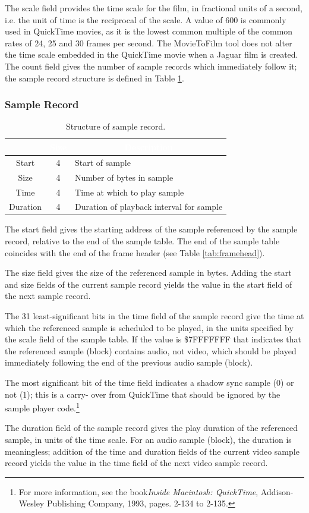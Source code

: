 \documentclass[12pt,letterpaper,twoside]{article}
\newcommand{\tabheadtxt}[1]{\multicolumn{1}{c}{\textcolor{white}{\textbf{#1}}}}
\begin{document}
The scale field provides the time scale for the film, in fractional units of a second, i.e. the unit of time is the reciprocal of the scale. A value of 600 is commonly used in QuickTime movies, as it is the lowest common multiple of the common rates of 24, 25 and 30 frames per second. The MovieToFilm tool does not alter the time scale embedded in the QuickTime movie when a Jaguar film is created. 
The count field gives the number of sample records which immediately follow it; the sample record structure is defined in Table \ref{tab:samplerec}.

\subsubsection{Sample Record}

\begin{table}[h]
\centering
\begin{tabular}{|c|c|p{9cm}|}
\hline
\rowcolor{black}
\tabheadtxt{Field} & \tabheadtxt{Size} & \tabheadtxt{Description} \\
\hline
Start & 4 & Start of sample\\
\hline
Size & 4 & Number of bytes in sample\\
\hline
Time & 4 & Time at which to play sample\\
\hline
Duration & 4 & Duration of playback interval for sample\\
\hline
\end{tabular}
\caption{Structure of sample record.}
\label{tab:samplerec}
\end{table}
\FloatBarrier

The start field gives the starting address of the sample referenced by the sample record, relative to the end of the sample table. The end of the sample table coincides with the end of the frame header (see Table \ref{tab:framehead}). 

The size field gives the size of the referenced sample in bytes. Adding the start and size fields of the current sample record yields the value in the start field of the next sample record. 

The 31 least-significant bits in the time field of the sample record give the time at which the referenced sample is scheduled to be played, in the units specified by the scale field of the sample table. If the value is \$7FFFFFFF that indicates that the referenced sample (block) contains audio, not video, which should be played immediately following the end of the previous audio sample (block). 

The most significant bit of the time field indicates a shadow sync sample (0) or not (1); this is a carry- over from QuickTime that should be ignored by the sample player code.\footnote{For more information, see the book\textit{Inside Macintosh: QuickTime}, Addison-Wesley Publishing Company, 1993, pages. 2-134 to 2-135.}

The duration field of the sample record gives the play duration of the referenced sample, in units of the time scale. For an audio sample (block), the duration is meaningless; addition of the time and duration fields of the current video sample record yields the value in the time field of the next video sample record.
\end{document}
